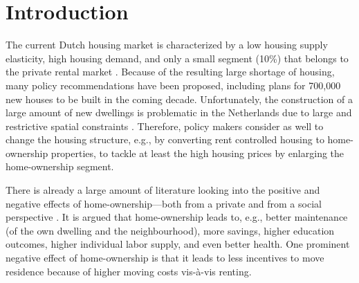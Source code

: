 \documentclass[fleqn,10pt]{SelfArx} %
\affiliation{\textsuperscript{1}\textit{Department of Spatial Economics, Vrije Universiteit Amsterdam, Amsterdam, The Netherlands}} %
\affiliation{*\textbf{Corresponding author}: \Letter{} t.de.graaff@vu.n; \Mundus{} \href{thomasdegraaff.nl}{thomasdegraaff.nl}} %
\begin{document}
	
	\flushbottom %
	\maketitle %
	\thispagestyle{empty} %
	
	
	\section{Introduction} %

        The current Dutch housing market is characterized by a low
        housing supply elasticity, high housing demand, and only a
        small segment (10\%) that belongs to the private rental market
        \citep{michielsen2017}. Because of the resulting large
        shortage of housing, many policy recommendations have been
        proposed, including plans for 700,000 new houses to be built
        in the coming decade. Unfortunately, the construction of a
        large amount of new dwellings is problematic in the
        Netherlands due to large and restrictive spatial constraints
        \citep{michielsen2019}. Therefore, policy makers consider 
        as well to change the housing structure, e.g., by converting
        rent controlled housing to home-ownership properties, to
        tackle at least the high housing prices by enlarging the
        home-ownership segment.
        
        There is already a large amount of literature looking into the positive
        and negative effects of home-ownership---both from a private and from a social perspective \citep[see for an
        overview][]{dietz2003social}. It is argued that home-ownership leads to,
        e.g., better maintenance (of the own dwelling and the neighbourhood),
        more savings, higher education outcomes, higher individual labor supply,
        and even better health. One prominent negative effect of home-ownership
        is that it leads to less incentives to move residence because of higher
        moving costs vis-\`{a}-vis renting.  
        
\end{document}
